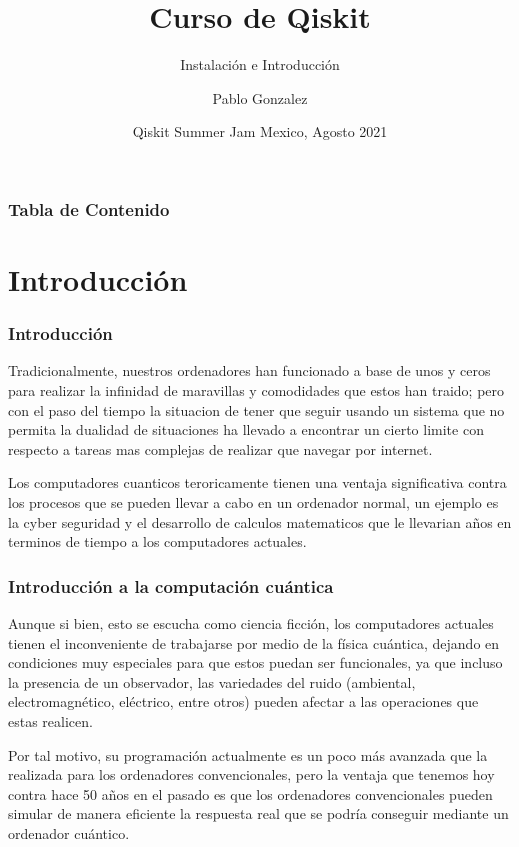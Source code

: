 \documentclass[spanish]{beamer}
\title[QMexico]  %
{Curso de Qiskit}   %
\subtitle{Instalación e Introducción}  %
\author{Pablo Gonzalez}  %
\institute[QMexico]  %
\date[Agosto 2021]  %
{Qiskit Summer Jam Mexico, Agosto 2021}
\begin{document}
\frame[plain]{\titlepage}


\begin{frame}
\frametitle{Tabla de Contenido}
\tableofcontents
\end{frame}
\section{Introducción}   
\newpage
\setlength{\parskip}{5mm}
\justify
\begin{frame}
\frametitle{Introducción}
Tradicionalmente, nuestros ordenadores han funcionado a base de unos y ceros para realizar la infinidad de maravillas y comodidades que estos han traido; pero con el paso del tiempo la situacion de tener que seguir usando un sistema que no permita la dualidad de situaciones ha llevado a encontrar un cierto limite con respecto a tareas mas complejas de realizar que navegar por internet.

Los computadores cuanticos teroricamente tienen una ventaja significativa contra los procesos que se pueden llevar a cabo en un ordenador normal, un ejemplo es la cyber seguridad y el desarrollo de calculos matematicos que le llevarian años en terminos de tiempo a los computadores actuales.
\end{frame}

\newpage
\setlength{\parskip}{5mm}
\begin{frame}
\frametitle{Introducción a la computación cuántica}
Aunque si bien, esto se escucha como ciencia ficción, los computadores actuales tienen el inconveniente de trabajarse por medio de la física cuántica, dejando en condiciones muy especiales para que estos puedan ser funcionales, ya que incluso la presencia de un observador, las variedades del ruido (ambiental, electromagnético, eléctrico, entre otros) pueden afectar a las operaciones que estas realicen.

Por tal motivo, su programación actualmente es un poco más avanzada que la realizada para los ordenadores convencionales, pero la ventaja que tenemos hoy contra hace 50 años en el pasado es que los ordenadores convencionales pueden simular de manera eficiente la respuesta real que se podría conseguir mediante un ordenador cuántico.
\end{frame}
\end{document}
